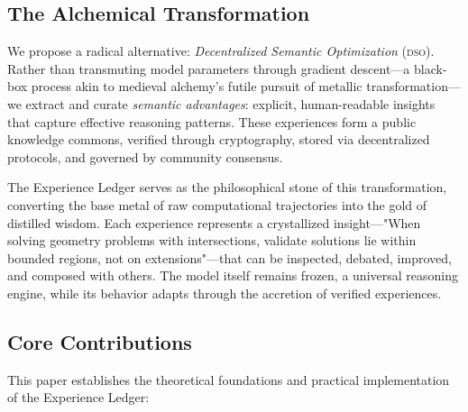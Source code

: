 \documentclass[11pt,letterpaper]{article}
\newcommand{\DSO}{\textsc{dso}}
\begin{document}
\subsection{The Alchemical Transformation}

We propose a radical alternative: \textit{Decentralized Semantic Optimization} (\DSO{}). Rather than transmuting model parameters through gradient descent—a black-box process akin to medieval alchemy's futile pursuit of metallic transformation—we extract and curate \textit{semantic advantages}: explicit, human-readable insights that capture effective reasoning patterns. These experiences form a public knowledge commons, verified through cryptography, stored via decentralized protocols, and governed by community consensus.

The Experience Ledger serves as the philosophical stone of this transformation, converting the base metal of raw computational trajectories into the gold of distilled wisdom. Each experience represents a crystallized insight—"When solving geometry problems with intersections, validate solutions lie within bounded regions, not on extensions"—that can be inspected, debated, improved, and composed with others. The model itself remains frozen, a universal reasoning engine, while its behavior adapts through the accretion of verified experiences.

\subsection{Core Contributions}

This paper establishes the theoretical foundations and practical implementation of the Experience Ledger:
\end{document}

